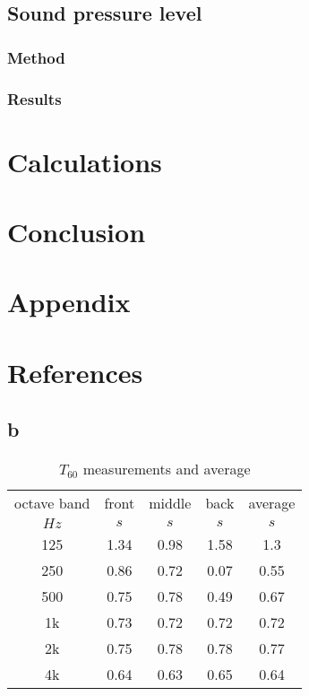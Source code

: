 \documentclass{article}
\begin{document}
\subsection{Sound pressure level}
\subsubsection{Method}
\subsubsection{Results}

\newpage
\section{Calculations}

\newpage
\section{Conclusion}

\newpage
\section{Appendix}

\newpage
\section{References}
	
\subsection{b}
\begin{table}
\begin{center}
\begin{tabular}{|c||c|c|c||c|}
\hline
octave band & front & middle & back & average	\\
$Hz$		&	$s$	&	$s$		&	$s$		&	$s$		\\
\hline
\hline
125			& 1.34	&	0.98	&	1.58	&	1.3		\\
\hline
250			& 0.86	&	0.72	&	0.07	&	0.55	\\
\hline
500			& 0.75	& 	0.78	&	0.49	&	0.67	\\
\hline
1k			& 0.73	&	0.72	&	0.72	&	0.72	\\
\hline
2k			& 0.75	&	0.78	&	0.78	&	0.77	\\
\hline
4k			& 0.64	&	0.63	&	0.65	& 	0.64	\\
\hline


\end{tabular}
\caption{$T_{60}$ measurements and average}
\label{tab:Tmeasurements}
\end{center}
\end{table}
\end{document}
